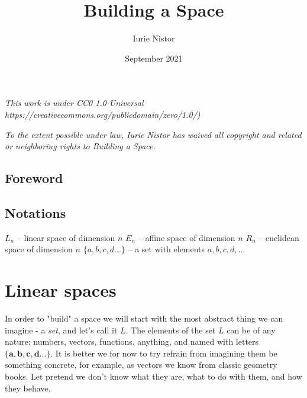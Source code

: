\documentclass{book}
\title{Building a Space}
\author{Iurie Nistor}
\date{September 2021}
\begin{document}
\maketitle

\newpage
\emph{This work is under CC0 1.0 Universal https://creativecommons.org/publicdomain/zero/1.0/)}

\emph{To the extent possible under law, Iurie Nistor has waived all copyright and related or neighboring rights to Building a Space.}

\tableofcontents

\section{Foreword}

\section{Notations}

$L_n$ --  linear space of dimension $n$
\newline
$E_n$ --  affine space of dimension $n$
\newline
$R_n$ --  euclidean space of dimension $n$
\newline
$\{a, b, c, d...\}$ -- a set with elements $a, b, c, d, ...$

\chapter{Linear spaces}

In order to "build" a space we will start with the most abstract thing we can imagine - a \emph{set}, and let's call it $L$. The elements of the set $L$ can be of any nature: numbers, vectors, functions, anything, and named with letters $\{\textbf{a}, \textbf{b}, \textbf{c}, \textbf{d}...\}$. It is better we for now to try refrain from imagining them be something concrete, for example, as vectors we know from classic geometry books. Let pretend we don't know what they are, what to do with them, and how they behave.
\end{document}

